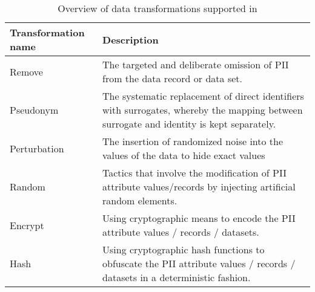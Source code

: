 \begin{table}[H]
\begin{center}
\begin{tabulary}{\textwidth}{p{0.20\textwidth}p{0.8\textwidth}}
\textbf{Transformation name} & \textbf{Description}                                                                                                                                                          \\ \hline
Remove               & The targeted and deliberate omission of PII from the data record or data set.                                                                                                 \\
Pseudonym            & The systematic replacement of direct identifiers with surrogates, whereby the mapping between surrogate and identity is kept separately.                                      \\
Perturbation         & The insertion of randomized noise into the values of the data to hide exact values                                                                                 \\
Random               & Tactics that involve the modification of PII attribute values/records by injecting artificial random elements.                                                                \\
Encrypt              & Using cryptographic means to encode the PII attribute values / records / datasets.                                                                                            \\
Hash                 & Using cryptographic hash functions to obfuscate the PII attribute values / records / datasets in a deterministic fashion.                                                                                            \\
\end{tabulary}
\caption{Overview of data transformations supported in \middleware{}}
\label{table:supported-transformations}
\end{center}
\end{table}